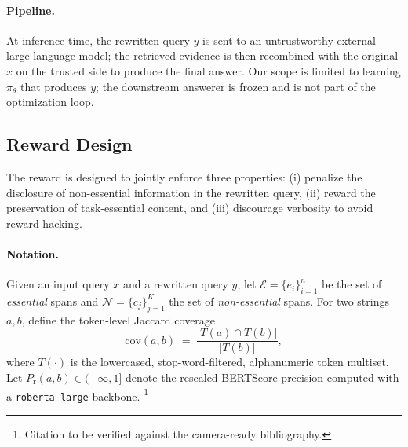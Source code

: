 \paragraph{Pipeline.}
At inference time, the rewritten query $y$ is sent to an untrustworthy
external large language model; the retrieved evidence is then
recombined with the original $x$ on the trusted side to produce the
final answer. Our scope is limited to learning $\pi_\theta$ that
produces $y$; the downstream answerer is frozen and is not part of
the optimization loop.

\subsection{Reward Design}
\label{sec:reward}

The reward is designed to jointly enforce three properties: (i)
penalize the disclosure of non-essential information in the rewritten
query, (ii) reward the preservation of task-essential content, and
(iii) discourage verbosity to avoid reward hacking.

\paragraph{Notation.}
Given an input query $x$ and a rewritten query $y$, let
$\mathcal{E}=\{e_i\}_{i=1}^{n}$ be the set of \emph{essential} spans
and $\mathcal{N}=\{c_j\}_{j=1}^{K}$ the set of \emph{non-essential}
spans. For two strings $a, b$, define the token-level Jaccard coverage
\begin{equation}
  \mathrm{cov}(a, b) \;=\; \frac{|T(a) \cap T(b)|}{|T(b)|},
\end{equation}
where $T(\cdot)$ is the lowercased, stop-word-filtered, alphanumeric
token multiset. Let $P_{\text{r}}(a, b) \in (-\infty, 1]$ denote the
rescaled BERTScore precision \citep{zhang2020bertscore} computed with
a \texttt{roberta-large} backbone.%
\footnote{Citation to be verified against the camera-ready bibliography.}

